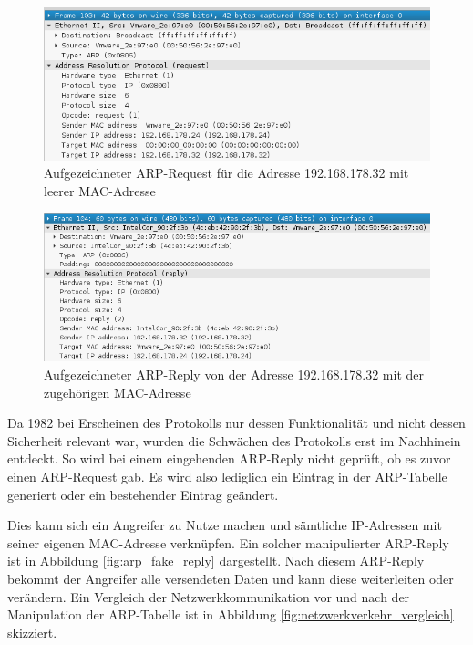 \begin{figure}
	\centering
	\includegraphics[width=\textwidth]{images/ARP_Spoofing/ARP_Request}
	\caption{Aufgezeichneter ARP-Request für die Adresse 192.168.178.32 mit leerer MAC-Adresse}
	\label{fig:arp_request}
\end{figure}

\begin{figure}
	\centering
	\includegraphics[width=\textwidth]{images/ARP_Spoofing/ARP_Reply}
	\caption{Aufgezeichneter ARP-Reply von der Adresse 192.168.178.32 mit der zugehörigen MAC-Adresse}
	\label{fig:arp_reply}
\end{figure}

Da 1982 bei Erscheinen des Protokolls nur dessen Funktionalität und nicht dessen Sicherheit relevant war, wurden die Schwächen des Protokolls erst im Nachhinein entdeckt. So wird bei einem eingehenden ARP-Reply nicht geprüft, ob es zuvor einen ARP-Request gab. Es wird also lediglich ein Eintrag in der ARP-Tabelle generiert oder ein bestehender Eintrag geändert.

Dies kann sich ein Angreifer zu Nutze machen und sämtliche IP-Adressen mit seiner eigenen MAC-Adresse verknüpfen. Ein solcher manipulierter ARP-Reply ist in Abbildung \ref{fig:arp_fake_reply} dargestellt. Nach diesem ARP-Reply bekommt der Angreifer alle versendeten Daten und kann diese weiterleiten oder verändern. Ein Vergleich der Netzwerkkommunikation vor und nach der Manipulation der ARP-Tabelle ist in Abbildung \ref{fig:netzwerkverkehr_vergleich} skizziert.

